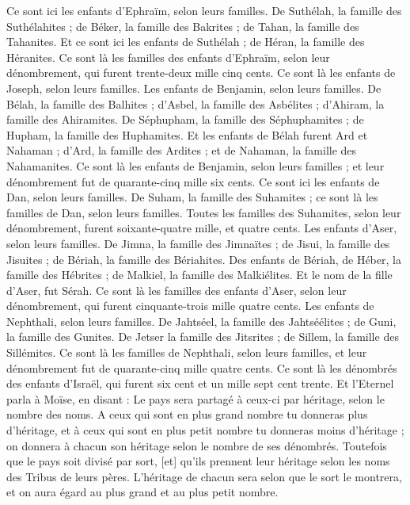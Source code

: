 \begin{multicols}{2}
Ce sont ici les enfants d'Ephraïm, selon leurs familles. De Suthélah, la famille des Suthélahites ; de Béker, la famille des Bakrites ; de Tahan, la famille des Tahanites.
Et ce sont ici les enfants de Suthélah ; de Héran, la famille des Héranites.
Ce sont là les familles des enfants d'Ephraïm, selon leur dénombrement, qui furent trente-deux mille cinq cents. Ce sont là les enfants de Joseph, selon leurs familles.
Les enfants de Benjamin, selon leurs familles. De Bélah, la famille des Balhites ; d'Asbel, la famille des Asbélites ; d'Ahiram, la famille des Ahiramites.
De Séphupham, la famille des Séphuphamites ; de Hupham, la famille des Huphamites.
Et les enfants de Bélah furent Ard et Nahaman ; d'Ard, la famille des Ardites ; et de Nahaman, la famille des Nahamanites.
Ce sont là les enfants de Benjamin, selon leurs familles ; et leur dénombrement fut de quarante-cinq mille six cents.
Ce sont ici les enfants de Dan, selon leurs familles. De Suham, la famille des Suhamites ; ce sont là les familles de Dan, selon leurs familles.
Toutes les familles des Suhamites, selon leur dénombrement, furent soixante-quatre mille, et quatre cents.
Les enfants d'Aser, selon leurs familles. De Jimna, la famille des Jimnaïtes ; de Jisui, la famille des Jisuites ; de Bériah, la famille des Bériahites.
Des enfants de Bériah, de Héber, la famille des Hébrites ; de Malkiel, la famille des Malkiélites.
Et le nom de la fille d'Aser, fut Sérah.
Ce sont là les familles des enfants d'Aser, selon leur dénombrement, qui furent cinquante-trois mille quatre cents.
Les enfants de Nephthali, selon leurs familles. De Jahtséel, la famille des Jahtséélites ; de Guni, la famille des Gunites.
De Jetser la famille des Jitsrites ; de Sillem, la famille des Sillémites.
Ce sont là les familles de Nephthali, selon leurs familles, et leur dénombrement fut de quarante-cinq mille quatre cents.
Ce sont là les dénombrés des enfants d'Israël, qui furent six cent et un mille sept cent trente.
Et l'Eternel parla à Moïse, en disant :
Le pays sera partagé à ceux-ci par héritage, selon le nombre des noms.
A ceux qui sont en plus grand nombre tu donneras plus d'héritage, et à ceux qui sont en plus petit nombre tu donneras moins d'héritage ; on donnera à chacun son héritage selon le nombre de ses dénombrés.
Toutefois que le pays soit divisé par sort, [et] qu'ils prennent leur héritage selon les noms des Tribus de leurs pères.
L'héritage de chacun sera selon que le sort le montrera, et on aura égard au plus grand et au plus petit nombre.

\end{multicols}
